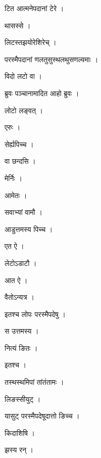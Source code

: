 \documentclass[10pt, openany]{book}
\begin{document}
\noindent टित आत्मनेपदानां टेरे ।

\noindent थासस्से ।

\noindent लिटस्तझयोरेशिरेच् ।

\noindent परस्मैपदानां णलतुसुस्थलथुसणल्वमाः ।

\noindent विदो लटो वा ।

\noindent ब्रुवः पञ्चानामादित आहो ब्रुवः ।

\noindent लोटो लङ्वत् ।

\noindent एरुः ।

\noindent सेर्ह्यपिच्च ।

\noindent वा छन्दसि ।

\noindent मेर्निः ।

\noindent आमेतः ।

\noindent सवाभ्यां वामौ ।

\noindent आडुत्तमस्य पिच्च ।

\noindent एत ऐ ।

\noindent लेटोऽडाटौ ।

\noindent आत ऐ ।

\noindent वैतोऽन्यत्र ।

\noindent इतश्च लोपः परस्मैपदेषु ।

\noindent स उत्तमस्य ।

\noindent नित्यं ङितः ।

\noindent इतश्च ।

\noindent तस्थस्थमिपां तांतंतामः ।

\noindent लिङस्सीयुट् ।

\noindent यासुट् परस्मैपदेषूदात्तो ङिच्च ।

\noindent किदाशिषि ।

\noindent झस्य रन् ।
\end{document}
